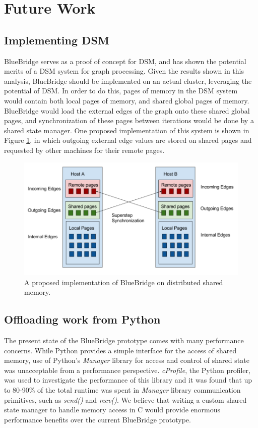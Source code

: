 \section{Future Work}
\label{sec:future}

\subsection{Implementing DSM}

BlueBridge serves as a proof of concept for DSM, and has shown the potential
merits of a DSM system for graph processing. Given the results shown in this
analysis, BlueBridge should be implemented on an actual cluster, leveraging
the potential of DSM. In order to do this, pages of memory in the DSM system
would contain both local pages of memory, and shared global pages of memory.
BlueBridge would load the external edges of the graph onto these shared global
pages, and synchronization of these pages between iterations would be done
by a shared state manager. One proposed implementation of this system is shown
in Figure \ref{fig:dsm}, in which outgoing external edge values are stored on
shared pages and requested by other machines for their remote pages.

\begin{figure}[h]
\includegraphics[width=\linewidth]{"fig/dsm_implementation"}
\caption{A proposed implementation of BlueBridge on distributed shared memory.}
\label{fig:dsm}
\end{figure}

\subsection{Offloading work from Python}

The present state of the BlueBridge prototype comes with many performance
concerns. While Python provides a simple interface for the access of shared
memory, use of Python's \textit{Manager} library for access and control of
shared state was unacceptable from a performance perspective. \textit{cProfile},
the Python profiler, was used to investigate the performance of this library
and it was found that up to 80-90\% of the total runtime was spent in
\textit{Manager} library communication primitives, such as \textit{send()} and
\textit{recv()}. We believe that writing a custom shared state manager to handle
memory access in C would provide enormous performance benefits over the current
BlueBridge prototype.